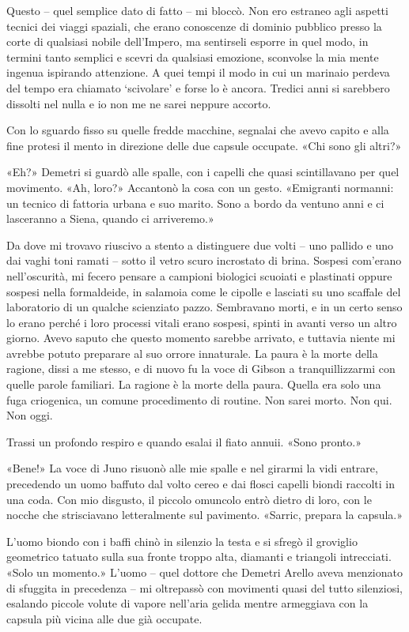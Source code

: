 Questo -- quel semplice dato di fatto -- mi bloccò. Non ero estraneo
agli aspetti tecnici dei viaggi spaziali, che erano conoscenze di
dominio pubblico presso la corte di qualsiasi nobile dell'Impero, ma
sentirseli esporre in quel modo, in termini tanto semplici e scevri da
qualsiasi emozione, sconvolse la mia mente ingenua ispirando attenzione.
A quei tempi il modo in cui un marinaio perdeva del tempo era chiamato
`scivolare' e forse lo è ancora. Tredici anni si sarebbero dissolti nel
nulla e io non me ne sarei neppure accorto.

Con lo sguardo fisso su quelle fredde macchine, segnalai che avevo
capito e alla fine protesi il mento in direzione delle due capsule
occupate. «Chi sono gli altri?»

«Eh?» Demetri si guardò alle spalle, con i capelli che quasi
scintillavano per quel movimento. «Ah, loro?» Accantonò la cosa con un
gesto. «Emigranti normanni: un tecnico di fattoria urbana e suo marito.
Sono a bordo da ventuno anni e ci lasceranno a Siena, quando ci
arriveremo.»

Da dove mi trovavo riuscivo a stento a distinguere due volti -- uno
pallido e uno dai vaghi toni ramati -- sotto il vetro scuro incrostato
di brina. Sospesi com'erano nell'oscurità, mi fecero pensare a campioni
biologici scuoiati e plastinati oppure sospesi nella formaldeide, in
salamoia come le cipolle e lasciati su uno scaffale del laboratorio di
un qualche scienziato pazzo. Sembravano morti, e in un certo senso lo
erano perché i loro processi vitali erano sospesi, spinti in avanti
verso un altro giorno. Avevo saputo che questo momento sarebbe arrivato,
e tuttavia niente mi avrebbe potuto preparare al suo orrore innaturale.
\label{fileintero-23.xhtml__idTextAnchor003}{}La paura è
la morte della ragione, dissi a me stesso, e di nuovo fu la voce di
Gibson a tranquillizzarmi con quelle parole familiari. La ragione è la
morte della paura. Quella era solo una fuga criogenica, un comune
procedimento di routine. Non sarei morto. Non qui. Non oggi.

Trassi un profondo respiro e quando esalai il fiato annuii. «Sono
pronto.»

«Bene!» La voce di Juno risuonò alle mie spalle e nel girarmi la vidi
entrare, precedendo un uomo baffuto dal volto cereo e dai flosci capelli
biondi raccolti in una coda. Con mio disgusto, il piccolo omuncolo entrò
dietro di loro, con le nocche che strisciavano letteralmente sul
pavimento. «Sarric, prepara la capsula.»

L'uomo biondo con i baffi chinò in silenzio la testa e si sfregò il
groviglio geometrico tatuato sulla sua fronte troppo alta, diamanti e
triangoli intrecciati. «Solo un momento.» L'uomo -- quel dottore che
Demetri Arello aveva menzionato di sfuggita in precedenza -- mi
oltrepassò con movimenti quasi del tutto silenziosi, esalando piccole
volute di vapore nell'aria gelida mentre armeggiava con la capsula più
vicina alle due già occupate.

